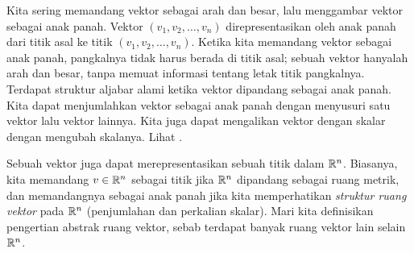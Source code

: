 Kita sering memandang vektor sebagai arah dan besar, lalu menggambar
vektor sebagai anak panah.  Vektor $(v_1,v_2,\ldots,v_n)$ direpresentasikan
oleh anak panah dari titik asal ke titik $(v_1,v_2,\ldots,v_n)$.
Ketika kita memandang vektor sebagai anak panah, pangkalnya
tidak harus berada di titik asal; sebuah vektor hanyalah arah dan
besar, tanpa memuat informasi tentang letak titik pangkalnya.
Terdapat struktur aljabar alami ketika vektor dipandang sebagai anak panah.
Kita dapat menjumlahkan vektor sebagai anak panah dengan menyusuri satu vektor lalu vektor lainnya.
Kita juga dapat mengalikan vektor dengan skalar dengan mengubah
skalanya.  Lihat .
\begin{myfigureht}
\caption{Vektor sebagai anak panah dalam $\R^2$, serta arti penjumlahan dan
perkalian skalar.\label{fig:vecasarrow}}
\end{myfigureht}

Sebuah vektor juga dapat merepresentasikan sebuah titik dalam ${\mathbb{R}}^n$.
Biasanya, kita memandang $v \in {\mathbb{R}}^n$
sebagai titik jika ${\mathbb{R}}^n$ dipandang sebagai ruang metrik, dan memandangnya
sebagai anak panah jika kita memperhatikan \emph{struktur ruang vektor} pada
${\mathbb{R}}^n$ (penjumlahan dan perkalian skalar).
Mari kita definisikan pengertian abstrak ruang vektor, sebab terdapat
banyak ruang vektor lain selain ${\mathbb{R}}^n$.

